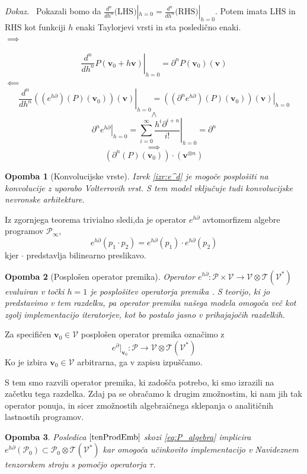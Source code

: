 \documentclass[a4paper, 12pt]{book}
\newcommand{\ed}{e^{h\partial}}
\newcommand{\T}{\mathcal{T}}
\newcommand{\VV}{\mathcal{V}}
\newcommand{\vv}{\mathbf{v}}
\newcommand{\dP}{\mathcal{P}}
\newcommand{\D}{\partial}
\newcommand{\sumd}{\tau}
\newtheorem{opomba}{Opomba}[chapter]
\newenvironment{dokaz}{\emph{Dokaz.}\ }{\hspace{\fill}{$\Box$}}
\begin{document}
 \begin{dokaz}
Pokazali bomo da $\frac{d^n}{dh^n}\text{(LHS)}|_{h=0}=\frac{d^n}{dh^n}\text{(RHS)}|_{h=0}$. Potem imata $\text{LHS}$ in $\text{RHS}$ kot funkciji $h$ enaki Taylorjevi vrsti in sta posledično enaki.\\
 $\implies$
 
 $$\left. \frac{d^n}{dh^n}P(\vv_0+h\vv)\right|_{h=0}=\D^n P(\vv_0)(\vv)$$
 $\impliedby$
 $$\left. \frac{d^n}{dh^n}\left((e^{h\D})(P)(\vv_0)\right)(\vv)\right|_{h=0}=
\left. \left((\D^n e^{h\D})(P)(\vv_0)\right)(\vv)\right|_{h=0}$$
 $$\land$$
 $$\left. \D^ne^{h\D}\right| _{h=0}=\left. \sum\limits_{i=0}^{\infty}\frac{h^i\D^{i+n}}{i!}\right|_{h=0}=\D^n$$
 $$\implies$$
 $$\left(\D^n(P)(\vv_0)\right)\cdot(\vv^{\otimes n})$$
 \end{dokaz}
 \begin{opomba}[Konvolucijske vrste]
 \label{konvVrst}
 Izrek \ref{izr:e^d} je mogoče posplošiti na konvolucije z uporabo Volterrovih vrst. S tem model vključuje tudi konvolucijske nevronske arhitekture.
 \end{opomba}
 
 Iz zgornjega teorema trivialno sledi,da je operator $\ed$ avtomorfizem algebre programov $\dP_\infty$,
 \begin{equation}\label{eq:prod}
  	e^{h\D}(p_1\cdot p_2)=e^{h\D}(p_1)\cdot e^{h\D}(p_2)
  \end{equation}
  kjer $\cdot$ predstavlja bilinearno preslikavo.
\begin{opomba}[Posplošen operator premika]\label{rmrk:genShift}
Operator $e^{h\D}:\dP\times \VV\to \VV\otimes \T(\VV^*)$ evaluiran v točki $h=1$ je posplošitev operatorja premika \cite{OpCalc}. S teorijo, ki jo predstavimo v tem razdelku, pa operator premika našega modela omogoča več kot zgolj implementacijo iteratorjev, kot bo postalo jasno v prihajajočih razdelkih.
\end{opomba}

Za specifičen $\vv_0\in\VV$ posplošen operator premika označimo z
 \begin{equation*}
 e^\D\vert_{\vv_0}:\dP\to \VV\otimes \T(\VV^*)
 \end{equation*}
Ko je izbira $\vv_0\in\VV$ arbitrarna, ga v zapisu izpuščamo.

S tem smo razvili operator premika, ki zadošča potrebo, ki smo izrazili na začetku tega razdelka. Zdaj pa se obračamo k drugim zmožnostim, ki nam jih tak operator ponuja, in sicer zmožnostih algebraičnega sklepanja o analitičnih lastnostih programov.
 \begin{opomba}
 Posledica $\ref{tenProdEmb}$ skozi \eqref{eq:P_algebra} implicira
      	$e^{h\D}(\dP_0)\subset\dP_0\otimes \T(\VV^*)$      
 kar omogoča učinkovito implementacijo v Navideznem tenzorskem stroju s pomočjo operatorja $\sumd$. 
\end{opomba}
\end{document}
